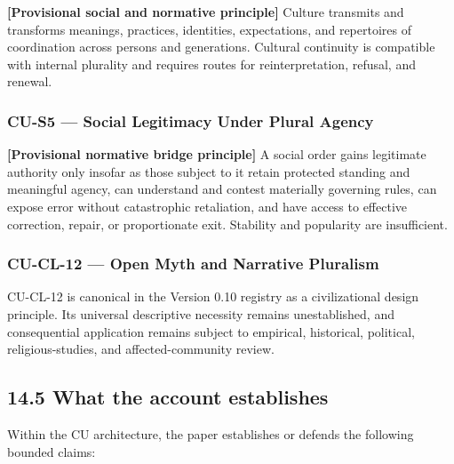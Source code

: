 \documentclass[
  11pt,
]{article}
\begin{document}
\textbf{{[}Provisional social and normative principle{]}} Culture
transmits and transforms meanings, practices, identities, expectations,
and repertoires of coordination across persons and generations. Cultural
continuity is compatible with internal plurality and requires routes for
reinterpretation, refusal, and renewal.

\subsubsection{CU-S5 --- Social Legitimacy Under Plural
Agency}\label{cu-s5-social-legitimacy-under-plural-agency}

\textbf{{[}Provisional normative bridge principle{]}} A social order
gains legitimate authority only insofar as those subject to it retain
protected standing and meaningful agency, can understand and contest
materially governing rules, can expose error without catastrophic
retaliation, and have access to effective correction, repair, or
proportionate exit. Stability and popularity are insufficient.

\subsubsection{CU-CL-12 --- Open Myth and Narrative
Pluralism}\label{cu-cl-12-open-myth-and-narrative-pluralism-1}

CU-CL-12 is canonical in the Version 0.10 registry as a civilizational
design principle. Its universal descriptive necessity remains
unestablished, and consequential application remains subject to
empirical, historical, political, religious-studies, and
affected-community review.

\subsection{14.5 What the account
establishes}\label{what-the-account-establishes}

Within the CU architecture, the paper establishes or defends the
following bounded claims:
\end{document}
